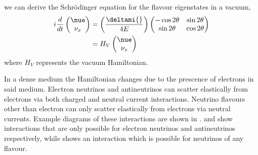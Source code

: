 we can derive the Schr\"odinger equation for the flavour eigenstates in a vacuum,
\begin{align}
  i \frac{d}{dt}
  \begin{pmatrix}
    \nue \\ \nu_{x}
  \end{pmatrix}
  &=
  \left( \frac{\deltami{}}{4E} \right)
  \begin{pmatrix}
    -\cos 2\theta & \sin 2\theta \\
    \sin 2\theta & \cos 2\theta
  \end{pmatrix} \\
  &=
  H_{V}
  \begin{pmatrix} \nue \\ \nu_{x} \end{pmatrix}
\end{align}
where $H_{V}$ represents the vacuum Hamiltonian.

In a dense medium the Hamiltonian changes due to the prescence of electrons in said medium.
Electron neutrinos and antineutrinos can scatter elastically from electrons via both charged and neutral current interactions.
Neutrino flavours other than electron can only scatter elastically from electrons via neutral currents.
Example diagrams of these interactions are shown in .
 and  show interactions that are only possible for electron neutrinos and antineutrinos respectively, while  shows an interaction which is possible for neutrinos of any flavour.

